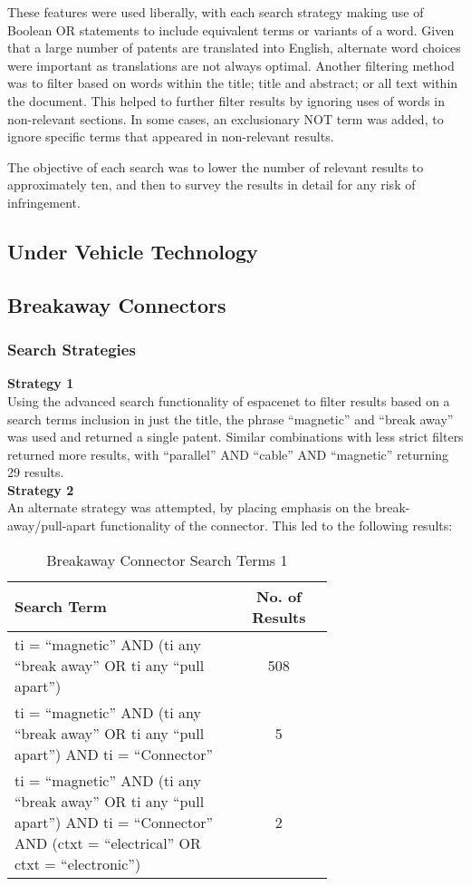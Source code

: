 \documentclass [12pt]{article}
\begin{document}
These features were used liberally, with each search strategy making use of Boolean OR statements to include equivalent terms or variants of a word. Given that a large number of patents are translated into English, alternate word choices were important as translations are not always optimal. Another filtering method was to filter based on words within the title; title and abstract; or all text within the document. This helped to further filter results by ignoring uses of words in non-relevant sections. In some cases, an exclusionary NOT term was added, to ignore specific terms that appeared in non-relevant results.

The objective of each search was to lower the number of relevant results to approximately ten, and then to survey the results in detail for any risk of infringement. 

\subsection{Under Vehicle Technology}\label{sec:under_vehilce_technology}
\subsection{Breakaway Connectors}\label{sec:breakaway_connectors}
\subsubsection{Search Strategies}
\textbf{Strategy 1}\\
Using the advanced search functionality of espacenet to filter results based on a search terms inclusion in just the title, the phrase “magnetic” and “break away” was used and returned a single patent. 
Similar combinations with less strict filters returned more results, with “parallel” AND “cable” AND “magnetic” returning 29 results. \\
\textbf{Strategy 2}\\
An alternate strategy was attempted, by placing emphasis on the break-away/pull-apart functionality of the connector. This led to the following results:

\begin{table}[H]
    \centering
    \setlength{\arrayrulewidth}{1.5pt}
    \begin{tabular}{|p{0.7\linewidth}|c|}
    \hline
    \cellcolor{gray!40}Search Term & \cellcolor{gray!40}No. of Results \\
    \hline
    ti = “magnetic” AND (ti any “break away” OR ti any “pull apart”) & 508 \\
    \hline
    ti = “magnetic” AND (ti any “break away” OR ti any “pull apart”) AND ti = “Connector” & 5 \\
    \hline
    ti = “magnetic” AND (ti any “break away” OR ti any “pull apart”) AND ti = “Connector” AND (ctxt = “electrical” OR ctxt = “electronic”) & 2 \\
    \hline
    \end{tabular}
    \caption{Breakaway Connector Search Terms 1}
    \label{table:breakaway_connector_search_strat_2}
\end{table}
\end{document}
